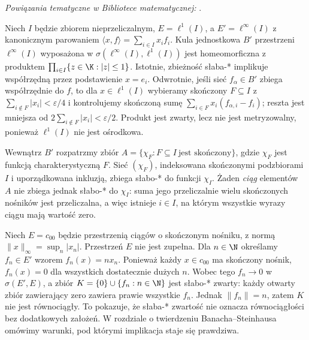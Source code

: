\noindent\emph{Powiązania tematyczne w Bibliotece matematycznej:} .


\begin{przyklad}\label{ex:uncountable-product}
Niech $I$ będzie zbiorem nieprzeliczalnym,
$E=\ell^1(I)$, a $E'=\ell^\infty(I)$ z kanonicznym parowaniem
$\langle x,f\rangle=\sum_{i\in I}x_i f_i$.
Kula jednostkowa $B'$ przestrzeni $\ell^\infty(I)$
wyposażona w $\sigma(\ell^\infty(I),\ell^1(I))$
jest homeomorficzna z produktem
$\prod_{i\in I}\{z\in\K:|z|\le1\}$.
Istotnie, zbieżność słaba-* implikuje współrzędną przez
podstawienie $x=e_i$. Odwrotnie, jeśli sieć $f_\alpha\in B'$
zbiega współrzędnie do $f$, to dla $x\in\ell^1(I)$
wybieramy skończony $F\subseteq I$ z
$\sum_{i\notin F}|x_i|<\varepsilon/4$ i kontrolujemy
skończoną sumę $\sum_{i\in F}x_i(f_{\alpha,i}-f_i)$;
reszta jest mniejsza od $2\sum_{i\notin F}|x_i|<\varepsilon/2$.
Produkt jest zwarty, lecz nie jest metryzowalny, ponieważ
$\ell^1(I)$ nie jest ośrodkowa.

Wewnątrz $B'$ rozpatrzmy zbiór
$A=\{\chi_F:F\subseteq I\ \text{jest skończony}\}$,
gdzie $\chi_F$ jest funkcją charakterystyczną $F$.
Sieć $(\chi_F)$, indeksowana skończonymi podzbiorami $I$
i uporządkowana inkluzją, zbiega słabo-* do funkcji
$\chi_I$. Żaden \emph{ciąg} elementów $A$ nie zbiega
jednak słabo-* do $\chi_I$: suma jego przeliczalnie wielu
skończonych nośników jest przeliczalna, a więc istnieje
$i\in I$, na którym wszystkie wyrazy ciągu mają wartość zero.
\end{przyklad}

\begin{przyklad}
\label{ex:compact-not-equicont}
Niech $E=c_{00}$ będzie przestrzenią ciągów o skończonym nośniku,
z normą $\|x\|_\infty=\sup_n|x_n|$. Przestrzeń $E$ nie jest
zupełna. Dla $n\in\N$ określamy $f_n\in E'$ wzorem
$f_n(x)=n x_n$. Ponieważ każdy $x\in c_{00}$ ma skończony
nośnik, $f_n(x)=0$ dla wszystkich dostatecznie dużych $n$.
Wobec tego $f_n\to0$ w $\sigma(E',E)$, a zbiór
$K=\{0\}\cup\{f_n:n\in\N\}$ jest słabo-* zwarty:
każdy otwarty zbiór zawierający zero zawiera prawie wszystkie $f_n$.
Jednak $\|f_n\|=n$, zatem $K$ nie jest równociągły.
To pokazuje, że słaba-* zwartość nie oznacza równociągłości
bez dodatkowych założeń. W rozdziale o twierdzeniu
Banacha--Steinhausa omówimy warunki, pod którymi implikacja
staje się prawdziwa.
\end{przyklad}

